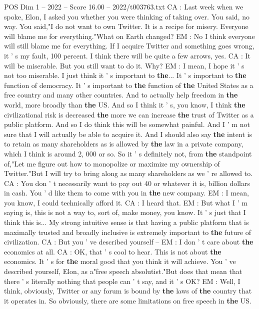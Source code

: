 \begin{textsample}{POS Dim 1 – 2022 – Score 16.00 – 2022/t003763.txt}
CA : Last week when we spoke, Elon, I asked you whether you were thinking of taking over.
You said, no way.
You said,"I do not want to own Twitter.
It is a recipe for misery.
Everyone will blame me for everything."What on Earth changed?
EM : No I think everyone will still blame me for everything.
If I acquire Twitter and something goes wrong, it ' s my fault, 100 percent.
I think there will be quite a few arrows, yes.
CA : It will be miserable.
But you still want to do it.
Why?
EM : I mean, I hope it ' s not too miserable.
I just think it ' s important to \textbf{the}...
It ' s important to \textbf{the} function of democracy.
It ' s important to \textbf{the} function of \textbf{the} United States as a free country and many other countries.
And to actually help freedom in \textbf{the} world, more broadly than \textbf{the} US.
And so I think it ' s, you know, I think \textbf{the} civilizational risk is decreased \textbf{the} more we can increase \textbf{the} trust of Twitter as a public platform.
And so I do think this will be somewhat painful.
And I ' m not sure that I will actually be able to acquire it.
And I should also say \textbf{the} intent is to retain as many shareholders as is allowed by \textbf{the} law in a private company, which I think is around 2, 000 or so.
So it ' s definitely not, from \textbf{the} standpoint of,"Let me figure out how to monopolize or maximize my ownership of Twitter."But I will try to bring along as many shareholders as we ' re allowed to.
CA : You don ' t necessarily want to pay out 40 or whatever it is, billion dollars in cash.
You ' d like them to come with you in \textbf{the} new company.
EM : I mean, you know, I could technically afford it.
CA : I heard that.
EM : But what I ' m saying is, this is not a way to, sort of, make money, you know.
It ' s just that I think this is...
My strong intuitive sense is that having a public platform that is maximally trusted and broadly inclusive is extremely important to \textbf{the} future of civilization.
CA : But you ' ve described yourself -- EM : I don ' t care about \textbf{the} economics at all.
CA : OK, that ' s cool to hear.
This is not about \textbf{the} economics.
It ' s for \textbf{the} moral good that you think it will achieve.
You ' ve described yourself, Elon, as a"free speech absolutist."But does that mean that there ' s literally nothing that people can ' t say, and it ' s OK?
EM : Well, I think, obviously, Twitter or any forum is bound by \textbf{the} laws of \textbf{the} country that it operates in.
So obviously, there are some limitations on free speech in \textbf{the} US.

\end{textsample}
